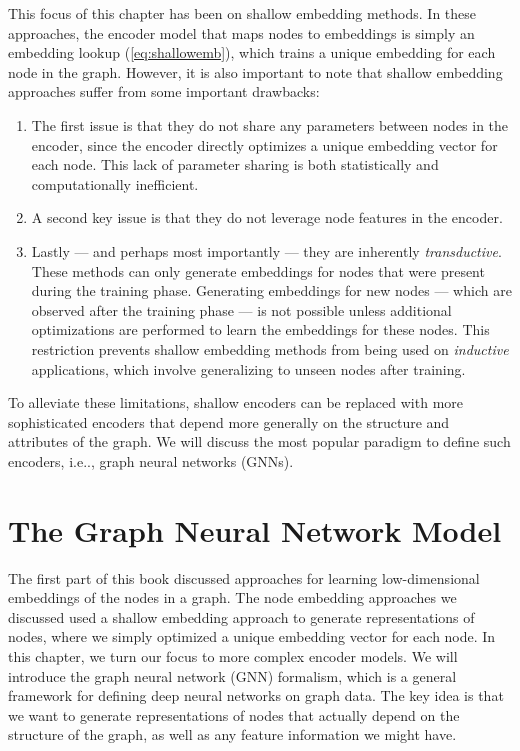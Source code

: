 \documentclass[10pt]{book}
\begin{document}
This focus of this chapter has been on shallow embedding methods. In these approaches, the encoder model that maps nodes to embeddings is simply an embedding lookup (\autoref{eq:shallowemb}), which trains a unique embedding for each node in the graph. However, it is also important to note that shallow embedding approaches suffer from some important drawbacks:
\begin{enumerate}
    \item The first issue is that they do not share any parameters between nodes in the encoder, since the encoder directly optimizes a unique embedding vector for each node. This lack of parameter sharing is both statistically and computationally inefficient.
    \item A second key issue is that they do not leverage node features in the encoder.
    \item Lastly --- and perhaps most importantly --- they are inherently \emph{transductive}. These methods can only generate embeddings for nodes that were present during the training phase. Generating embeddings for new nodes --- which are observed after the training phase --- is not possible unless additional optimizations are performed to learn the embeddings for these nodes. This restriction prevents shallow embedding methods from being used on \emph{inductive} applications, which involve generalizing to unseen nodes after training.
\end{enumerate}

To alleviate these limitations, shallow encoders can be replaced with more sophisticated encoders that depend more generally on the structure and attributes of the graph. We will discuss the most popular paradigm to define such encoders, i.e.., graph neural networks (GNNs).


\section{The Graph Neural Network Model}
\label{sec:GNNmodel}

The first part of this book discussed approaches for learning low-dimensional embeddings of the nodes in a graph. The node embedding approaches we discussed used a shallow embedding approach to generate representations of nodes, where we simply optimized a unique embedding vector for each node. In this chapter, we turn our focus to more complex encoder models. We will introduce the graph neural network (GNN) formalism, which is a general framework for defining deep neural networks on graph data. The key idea is that we want to generate representations of nodes that actually depend on the structure of the graph, as well as any feature information we might have.
\end{document}
